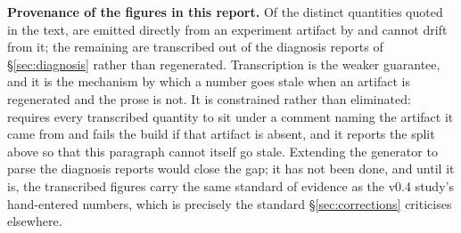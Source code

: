 \textbf{Provenance of the figures in this report.} Of the \numProvUsed{}
distinct quantities quoted in the text, \numProvGenerated{} are emitted directly
from an experiment artifact by  and cannot
drift from it; the remaining \numProvTranscribed{} are transcribed out of the
diagnosis reports of \S\ref{sec:diagnosis} rather than regenerated. Transcription
is the weaker guarantee, and it is the mechanism by which a number goes stale
when an artifact is regenerated and the prose is not. It is constrained rather
than eliminated:  requires every transcribed
quantity to sit under a comment naming the artifact it came from and fails the
build if that artifact is absent, and it reports the split above so that this
paragraph cannot itself go stale. Extending the generator to parse the diagnosis
reports would close the gap; it has not been done, and until it is, the
\numProvTranscribed{} transcribed figures carry the same standard of evidence as
the v0.4 study's hand-entered numbers, which is precisely the standard
\S\ref{sec:corrections} criticises elsewhere.
